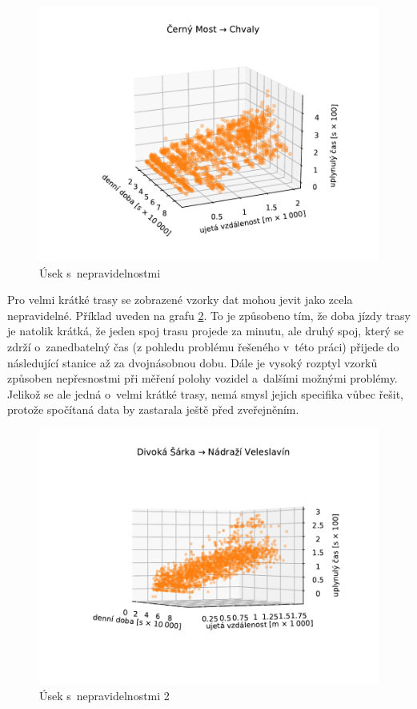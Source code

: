 \begin{figure}
\centering
  \includegraphics[width=\linewidth]{../img/4383_2712}
  \caption{Úsek s~nepravidelnostmi}
  \label{fig:cerny_most_chvaly}
\end{figure}

\bigbreak


Pro velmi krátké trasy se zobrazené vzorky dat mohou jevit jako zcela nepravidelné. Příklad uveden na grafu \ref{fig:divoka_sarka_veleslavin}. To je způsobeno tím, že doba jízdy trasy je natolik krátká, že jeden spoj trasu projede za minutu, ale druhý spoj, který se zdrží o~zanedbatelný čas (z pohledu problému řešeného v~této práci) přijede do následující stanice až za dvojnásobnou dobu. Dále je vysoký rozptyl vzorků způsoben nepřesnostmi při měření polohy vozidel a~dalšími možnými problémy. Jelikož se ale jedná o~velmi krátké trasy, nemá smysl jejich specifika vůbec řešit, protože spočítaná data by zastarala ještě před zveřejněním.


\begin{figure}
\centering
  \includegraphics[width=\linewidth]{../img/164_165}
  \caption{Úsek s~nepravidelnostmi 2}
  \label{fig:divoka_sarka_veleslavin}
\end{figure}

